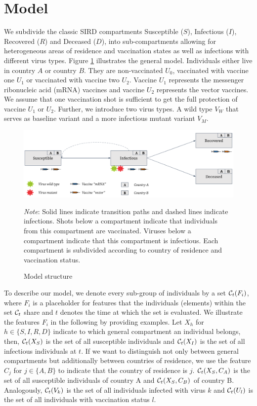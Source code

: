 \section{Model}
\label{sec:model}
We subdivide the classic SIRD compartments Susceptible ($S$), Infectious ($I$), Recovered ($R$) and Deceased ($D$), into sub-compartments allowing for heterogeneous areas of residence and vaccination states as well as infections with different virus types. Figure \ref{fig:model} illustrates the general model. Individuals either live in country $A$ or country $B$. They are non-vaccinated $U_0$, vaccinated with vaccine one $U_1$ or vaccinated with vaccine two $U_2$. Vaccine $U_1$ represents the messenger ribonucleic acid (mRNA) vaccines and vaccine $U_2$ represents the vector vaccines. We assume that one vaccination shot is sufficient to get the full protection of vaccine $U_1$ or $U_2$. Further, we introduce two virus types. A wild type $V_W$ that serves as baseline variant and a more infectious mutant variant $V_M$.\\
\begin{figure}[h!]
\centering
\includegraphics[scale=0.3]{images/vaccination_pp_blue_orange.png}\\
\begin{flushleft}
\scriptsize{\textit{Note}: Solid lines indicate transition paths and dashed lines indicate infections. Shots below a compartment indicate that individuals from this compartment are vaccinated. Viruses below a compartment indicate that this compartment is infectious. Each compartment is subdivided according to country of residence and vaccination status.}
\end{flushleft}
\caption{Model structure}
\label{fig:model}
\end{figure}

To describe our model, we denote every sub-group of individuals by a set $\mathcal{C}_t(F_i)$, where $F_i$ is a placeholder for features that the individuals (elements) within the set $\mathcal{C}_t$ share and $t$ denotes the time at which the set is evaluated. We illustrate the features $F_i$ in the following by providing examples. Let $X_h$ for $h \in \{S, I, R, D \}$ indicate to which general compartment an individual belongs, then, $\mathcal{C}_t(X_S)$ is the set of all susceptible individuals and $\mathcal{C}_t(X_I)$ is the set of all infectious individuals at $t$. If we want to distinguish not only between general compartments but additionally between countries of residence, we use the feature $C_j$ for $j \in \{A, B\}$ to indicate that the country of residence is $j$. $\mathcal{C}_t(X_S, C_A)$ is the set of all susceptible individuals of country A and $\mathcal{C}_t(X_S, C_B)$ of country B. Analogously, $\mathcal{C}_t(V_k)$ is the set of all individuals infected with virus $k$ and $\mathcal{C}_t(U_l)$ is the set of all individuals with vaccination status $l$.\\

